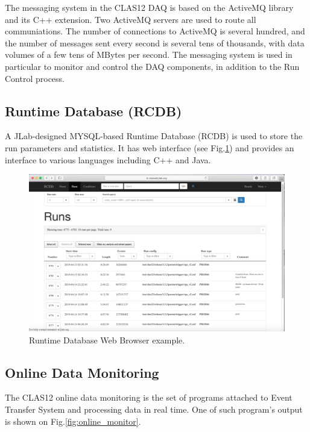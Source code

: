 The messaging system in the CLAS12 DAQ is based on the ActiveMQ library and its C++ extension. Two ActiveMQ servers are used to route all communiations. The number of connections to ActiveMQ is several hundred, and the number of messages sent every second is several tens of thousands, with data volumes of a few tens of MBytes per second. The messaging system is used in particular to monitor and control the DAQ components, in addition to the Run Control process.


\subsection{Runtime Database (RCDB)}

A JLab-designed MYSQL-based Runtime Database (RCDB) is used to store the run parameters and statistics. It has web interface (see Fig.\ref{fig:rcdb}) and provides an interface to various languages including C++ and Java.

\begin{figure}[hbt]
	\centering
	\includegraphics[width=1.0\columnwidth,keepaspectratio]{img/rcdb.png}
	\caption{Runtime Database Web Browser example.}
	\label{fig:rcdb}
\end{figure}

\subsection{Online Data Monitoring}

The CLAS12 online data monitoring is the set of programs attached to Event Transfer System and processing data in real time. One of such program's output is shown on Fig.\ref{fig:online_monitor}.

